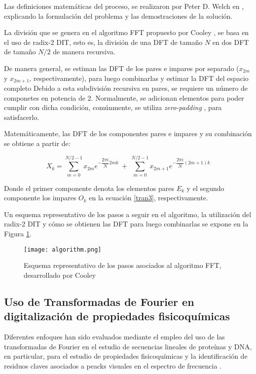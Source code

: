 Las definiciones matemáticas del proceso, se realizaron por Peter D. Welch en \cite{welch1967use}, explicando la formulación del problema y las demostraciones de la solución. 

La división que se genera en el algoritmo FFT propuesto por Cooley \cite{cooley1970fast}, se basa en el uso de radix-2 DIT, esto es, la división de una DFT de tamaño $N$ en dos DFT de tamaño $N/2$ de manera recursiva.

De manera general, se estiman las DFT de los pares e impares por separado ($x_{2m}$ y $x_{2m+1}$, respectivamente), para luego combinarlas y estimar la DFT del espacio completo Debido a esta subdivisión recursiva en pares, se requiere un número de componetes en potencia de 2. Normalmente, se adicionan elementos para poder cumplir con dicha condición, comúnmente, se utiliza \textit{zero-padding} \cite{muquet2002cyclic}, para satisfacerlo.

Matemáticamente, las DFT de los componentes pares e impares y su combinación se obtiene a partir de:

\begin{equation}
	X_{k} = \sum_{m=0}^{N/2 -1} x_{2m} e ^{-\dfrac{2\pi i}{N}2mk}\ +\ \sum_{m=0}^{N/2 -1} x_{2m+1} e ^{-\dfrac{2\pi i}{N}(2m+1)k} 
	\label{tran3}
\end{equation}  

Donde el primer componente denota los elementos pares $E_k$ y el segundo componente los impares $O_k$ en la ecuación \ref{tran3}, respectivamente.

Un esquema representativo de los pasos a seguir en el algoritmo, la utilización del radix-2 DIT y cómo se obtienen las DFT para luego combinarlas se expone en la Figura \ref{algo}.
\begin{figure}[!h]
	
	\centering
	\texttt{[image: algorithm.png]}
	\caption{Esquema representativo de los pasos asociados al algoritmo FFT, desarrollado por Cooley \cite{cooley1970fast}}
	\label{algo}
\end{figure}

\subsection{Uso de Transformadas de Fourier en digitalización de propiedades fisicoquímicas}

Diferentes enfoques han sido evaluados mediante el empleo del uso de las transformadas de Fourier en el estudio de secuencias lineales de proteínas y DNA, en particular, para el estudio de propiedades fisicoquímicas y la identificación de residuos claves asociados a peacks visuales en el espectro de frecuencia \cite{veljkovic1985possible, cosic1987prediction}. 

